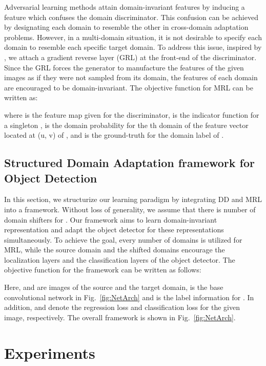 \documentclass[10pt,twocolumn,letterpaper]{article}
\begin{document}
Adversarial learning methods attain domain-invariant features by inducing a feature which confuses the domain discriminator.
This confusion can be achieved by designating each domain to resemble the other in cross-domain adaptation problems.
However, in a multi-domain situation, it is not desirable to specify each domain to resemble each specific target domain.
To address this issue, inspired by \cite{DeepAlign2_GRL}, we attach a gradient reverse layer (GRL) at the front-end of the discriminator.
Since the GRL forces the generator to manufacture the features of the given images as if they were not sampled from its domain, the features of each domain are encouraged to be domain-invariant.
The objective function for MRL can be written as:

where  is the feature map given for the discriminator,  is the indicator function for a singleton ,  is the domain probability for the th domain of the feature vector located at (u, v) of , and  is the ground-truth for the domain label of .

\subsection{Structured Domain Adaptation framework for Object Detection}
In this section, we structurize our learning paradigm by integrating DD and MRL into a framework.
Without loss of generality, we assume that there is  number of domain shifters  for .
Our framework aims to learn domain-invariant representation and adapt the object detector for these representations simultaneously.
To achieve the goal, every  number of domains is utilized for MRL, while the source domain and the shifted domains encourage the localization layers and the classification layers of the object detector. 
The objective function for the framework can be written as follows:




Here,  and  are images of the source and the target domain,  is the base convolutional network in Fig.~\ref{fig:NetArch} and  is the label information for .
In addition,  and  denote the regression loss and classification loss for the given image, respectively.
The overall framework is shown in Fig.~\ref{fig:NetArch}.








\section{Experiments}
\end{document}
